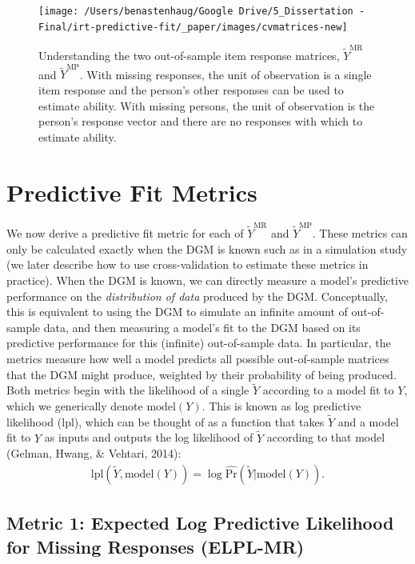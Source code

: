 \documentclass[
  english,
  man,floatsintext]{apa7}
\begin{document}
\begin{figure}

{\centering \texttt{[image: /Users/benastenhaug/Google Drive/5\_Dissertation - Final/irt-predictive-fit/\_paper/images/cvmatrices-new]} 

}

\caption{Understanding the two out-of-sample item response matrices, $\tilde Y^{\text{MR}}$ and $\tilde Y^{\text{MP}}$. With missing responses, the unit of observation is a single item response and the person's other responses can be used to estimate ability. With missing persons, the unit of observation is the person's response vector and there are no responses with which to estimate ability.}\label{fig:elpl}
\end{figure}

\hypertarget{pfm}{%
\section{Predictive Fit Metrics}\label{pfm}}

We now derive a predictive fit metric for each of \(\tilde Y^{\text{MR}}\) and \(\tilde Y^{\text{MP}}\). These metrics can only be calculated exactly when the DGM is known such as in a simulation study (we later describe how to use cross-validation to estimate these metrics in practice). When the DGM is known, we can directly measure a model's predictive performance on the \emph{distribution of data} produced by the DGM. Conceptually, this is equivalent to using the DGM to simulate an infinite amount of out-of-sample data, and then measuring a model's fit to the DGM based on its predictive performance for this (infinite) out-of-sample data. In particular, the metrics measure how well a model predicts all possible out-of-sample matrices that the DGM might produce, weighted by their probability of being produced. Both metrics begin with the likelihood of a single \(\tilde{Y}\) according to a model fit to \(Y\), which we generically denote \(\text{model}(Y)\). This is known as log predictive likelihood (lpl), which can be thought of as a function that takes \(\tilde Y\) and a model fit to \(Y\) as inputs and outputs the log likelihood of \(\tilde Y\) according to that model (Gelman, Hwang, \& Vehtari, 2014):
\begin{align}
\text{lpl}(\tilde{Y}, \text{model}(Y))  = \log \hat{\text{Pr}}(\tilde{Y} | \text{model}(Y)).
\end{align}

\hypertarget{metric-1-expected-log-predictive-likelihood-for-missing-responses-elpl-mr}{%
\subsection{Metric 1: Expected Log Predictive Likelihood for Missing Responses (ELPL-MR)}\label{metric-1-expected-log-predictive-likelihood-for-missing-responses-elpl-mr}}
\end{document}
